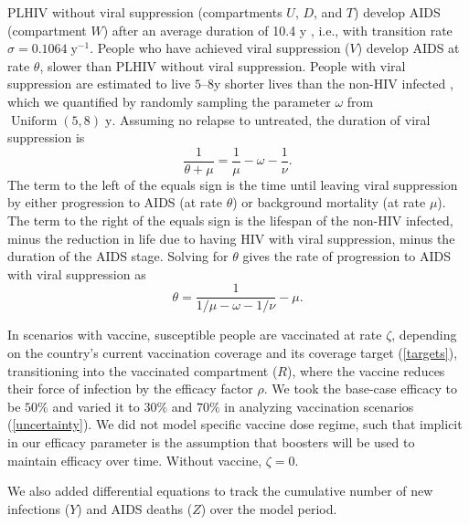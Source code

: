 \documentclass{article}
\DeclareMathOperator{\Uniform}{Uniform}
\begin{document}
PLHIV without viral suppression (compartments $U$, $D$, and $T$)
develop AIDS (compartment $W$) after an average duration of 10.4 y
\cite{Morgan2002-cq}, i.e., with transition rate
$\sigma = 0.1064\;\text{y$^{-1}$}$.  People who have achieved viral
suppression ($V$) develop AIDS at rate $\theta$, slower than PLHIV
without viral suppression.  People with viral suppression are
estimated to live $5$--$8$\;y shorter lives than the non-HIV infected
\cite{Samji2013-kf, Unaids2014-ue}, which we quantified by randomly
sampling the parameter $\omega$ from $\Uniform(5, 8)\;\text{y}$.
Assuming no relapse to untreated, the duration of viral suppression is
\begin{equation}
  \frac{1}{\theta + \mu} = \frac{1}{\mu} - \omega - \frac{1}{\nu}.
\end{equation}
The term to the left of the equals sign is the time until leaving
viral suppression by either progression to AIDS (at rate $\theta$) or
background mortality (at rate $\mu$).  The term to the right of the
equals sign is the lifespan of the non-HIV infected, minus the
reduction in life due to having HIV with viral suppression, minus the
duration of the AIDS stage.  Solving for $\theta$ gives the rate of
progression to AIDS with viral suppression as
\begin{equation}
  \label{theta}
  \theta = \frac{1}{1/\mu - \omega - 1/\nu} - \mu.
\end{equation}

In scenarios with vaccine, susceptible people are vaccinated at rate
$\zeta$, depending on the country's current vaccination coverage and
its coverage target (\autoref{targets}), transitioning into the
vaccinated compartment ($R$), where the vaccine reduces their force of
infection by the efficacy factor $\rho$.  We took the base-case
efficacy to be $50\%$ and varied it to $30\%$ and $70\%$ in analyzing
vaccination scenarios (\autoref{uncertainty}).  We did not model
specific vaccine dose regime, such that implicit in our efficacy
parameter is the assumption that boosters will be used to maintain
efficacy over time.  Without vaccine, $\zeta = 0$.

We also added differential equations to track the cumulative number of
new infections ($Y$) and AIDS deaths ($Z$) over the model period.
\end{document}
